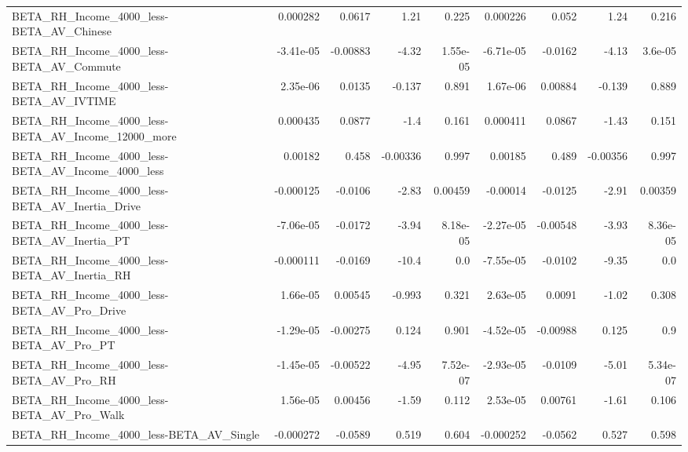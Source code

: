 \begin{tabular}{lrrrrrrrr}
BETA\_RH\_Income\_4000\_less-BETA\_AV\_Chinese           &    0.000282 &       0.0617 &     1.21 &    0.225 &   0.000226 &       0.052 &         1.24 &         0.216 \\
BETA\_RH\_Income\_4000\_less-BETA\_AV\_Commute           &   -3.41e-05 &     -0.00883 &    -4.32 & 1.55e-05 &  -6.71e-05 &     -0.0162 &        -4.13 &       3.6e-05 \\
BETA\_RH\_Income\_4000\_less-BETA\_AV\_IVTIME            &    2.35e-06 &       0.0135 &   -0.137 &    0.891 &   1.67e-06 &     0.00884 &       -0.139 &         0.889 \\
BETA\_RH\_Income\_4000\_less-BETA\_AV\_Income\_12000\_more &    0.000435 &       0.0877 &     -1.4 &    0.161 &   0.000411 &      0.0867 &        -1.43 &         0.151 \\
BETA\_RH\_Income\_4000\_less-BETA\_AV\_Income\_4000\_less  &     0.00182 &        0.458 & -0.00336 &    0.997 &    0.00185 &       0.489 &     -0.00356 &         0.997 \\
BETA\_RH\_Income\_4000\_less-BETA\_AV\_Inertia\_Drive     &   -0.000125 &      -0.0106 &    -2.83 &  0.00459 &   -0.00014 &     -0.0125 &        -2.91 &       0.00359 \\
BETA\_RH\_Income\_4000\_less-BETA\_AV\_Inertia\_PT        &   -7.06e-05 &      -0.0172 &    -3.94 & 8.18e-05 &  -2.27e-05 &    -0.00548 &        -3.93 &      8.36e-05 \\
BETA\_RH\_Income\_4000\_less-BETA\_AV\_Inertia\_RH        &   -0.000111 &      -0.0169 &    -10.4 &      0.0 &  -7.55e-05 &     -0.0102 &        -9.35 &           0.0 \\
BETA\_RH\_Income\_4000\_less-BETA\_AV\_Pro\_Drive         &    1.66e-05 &      0.00545 &   -0.993 &    0.321 &   2.63e-05 &      0.0091 &        -1.02 &         0.308 \\
BETA\_RH\_Income\_4000\_less-BETA\_AV\_Pro\_PT            &   -1.29e-05 &     -0.00275 &    0.124 &    0.901 &  -4.52e-05 &    -0.00988 &        0.125 &           0.9 \\
BETA\_RH\_Income\_4000\_less-BETA\_AV\_Pro\_RH            &   -1.45e-05 &     -0.00522 &    -4.95 & 7.52e-07 &  -2.93e-05 &     -0.0109 &        -5.01 &      5.34e-07 \\
BETA\_RH\_Income\_4000\_less-BETA\_AV\_Pro\_Walk          &    1.56e-05 &      0.00456 &    -1.59 &    0.112 &   2.53e-05 &     0.00761 &        -1.61 &         0.106 \\
BETA\_RH\_Income\_4000\_less-BETA\_AV\_Single            &   -0.000272 &      -0.0589 &    0.519 &    0.604 &  -0.000252 &     -0.0562 &        0.527 &         0.598 \\

\end{tabular}
